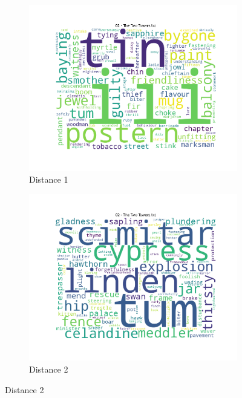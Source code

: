 \documentclass{article}
\begin{document}
\begin{figure}[H]
    \centering
    \begin{subfigure}[b]{0.3\textwidth}
        \includegraphics[width=\textwidth]{img/Word Cloud1.png}
        \caption{Distance 1}
        \label{fig:wordcloud_1}
    \end{subfigure}
    \hfill
    \begin{subfigure}[b]{0.3\textwidth}
        \includegraphics[width=\textwidth]{img/Word Cloud2.png}
        \caption{Distance 2}
        \label{fig:wordcloud_2}
    \end{subfigure}
    \hfill

\end{figure}
\end{document}
